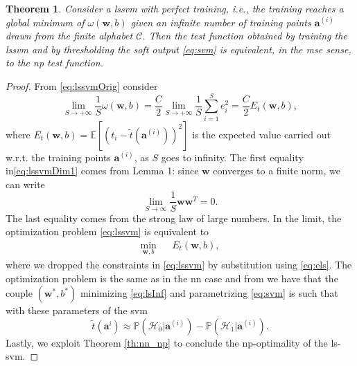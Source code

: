 \documentclass[draftcls,onecolumn,12pt]{IEEEtran}
\newcommand{\ie}{i.e., }
\newcommand{\wrt}{w.r.t. }
\newcommand{\Exp}[1]{\mathbb{E}\left[#1\right]}
\newcommand{\E}{E}
\newtheorem{theorem}{Theorem}
\begin{document}
\begin{theorem}
	\label{th:lsnp}
	Consider a \ac{lssvm} with perfect training, \ie the training reaches a global minimum of $\omega(\bm{w},b)$ given an infinite number of training points $\bm{a}^{(i)}$ drawn from the finite alphabet $\mathcal C$. Then the test function obtained by training the \ac{lssvm} and by thresholding the soft output \eqref{eq:svm} is equivalent, in the \ac{mse} sense, to the \ac{np} test function.
\end{theorem}
\begin{proof}
	From \eqref{eq:lssvmOrig} consider
	\begin{equation}
	\label{eq:lssvmDim1}
	\lim_{S \to +\infty} \frac{1}{S} \omega(\bm{w},b) =\frac{C}{2} \lim_{S \to +\infty}\frac{1}{S}  \sum_{i=1}^S e^2_i	=\frac{C}{2}\E_t(\bm{w},b),
	\end{equation}
	where $\E_t(\bm{w},b) = \Exp{\left(t_i - \tilde{t}(\bm{a}^{(i)})\right)^2} $ is the expected value carried out \wrt the training points $\bm{a}^{(i)}$, as $S$ goes to infinity. 	The first equality in\eqref{eq:lssvmDim1} comes from Lemma 1: since $\bm{w}$ converges to a finite norm, we can write
	\begin{equation}
	\lim_{S\to \infty} \frac{1}{S} \bm{w} \bm{w}^T 	= 0.
	\end{equation} 
	The last equality comes from the strong law of large numbers. In the limit, the optimization problem \eqref{eq:lssvm} is equivalent to
	\begin{equation}
	\label{eq:lsInf}
	\begin{aligned}
	& \underset{\bm{w},b}{\text{min}} & &  \E_t(\bm{w},b), & 
	\end{aligned}	
	\end{equation}
	where we dropped the constraints in \eqref{eq:lssvm} by substitution using \eqref{eq:els}. The optimization problem is the same as in the \ac{nn} case and from \cite{Ruck-90} we have that the couple $(\bm{w}^*,b^*)$ minimizing \eqref{eq:lsInf} and parametrizing \eqref{eq:svm} is such that with these parameters of the \ac{svm}
	\begin{equation}
	\tilde{t}(\bm{a}^i)  \approx \mathbb{P}(\mathcal{H}_0|\bm{a}^{(i)}) - \mathbb{P}(\mathcal{H}_1|\bm{a}^{(i)}).
	\end{equation}
	Lastly, we exploit Theorem \ref{th:nn_np} to conclude the \ac{np}-optimality of the \ac{ls}-\ac{svm}.
\end{proof}
\end{document}
